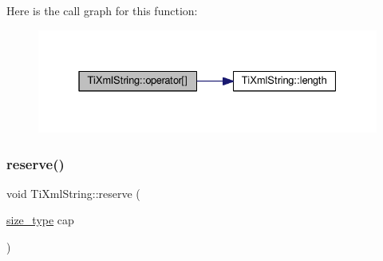 Here is the call graph for this function\+:\nopagebreak
\begin{figure}[H]
\begin{center}
\leavevmode
\includegraphics[width=331pt]{class_ti_xml_string_a06e8c84831fc146610369405f4aa4200_cgraph}
\end{center}
\end{figure}
\mbox{\label{class_ti_xml_string_a88ecf9f0f00cb5c67b6b637958d7049c}} 
\subsubsection{\texorpdfstring{reserve()}{reserve()}}
{\footnotesize\ttfamily void Ti\+Xml\+String\+::reserve (\begin{DoxyParamCaption}\item[{\hyperlink{class_ti_xml_string_abeb2c1893a04c17904f7c06546d0b971}{size\+\_\+type}}]{cap }\end{DoxyParamCaption})}

